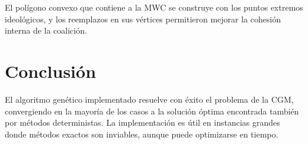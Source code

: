\documentclass[12pt]{article}
\begin{document}
El polígono convexo que contiene a la MWC se construye con los puntos extremos ideológicos, y los reemplazos en sus vértices permitieron mejorar la cohesión interna de la coalición.

\section*{Conclusión}

El algoritmo genético implementado resuelve con éxito el problema de la CGM, convergiendo en la mayoría de los casos a la solución óptima encontrada también por métodos deterministas. La implementación es útil en instancias grandes donde métodos exactos son inviables, aunque puede optimizarse en tiempo.
\end{document}

